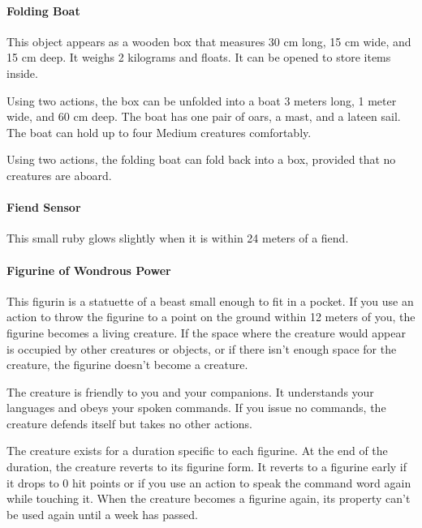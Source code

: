     \paragraph{Folding Boat}
        This object appears as a wooden box that measures 30 cm long, 15 cm wide, and 15 cm deep.
        It weighs 2 kilograms and floats.
        It can be opened to store items inside.

        Using two actions, the box can be unfolded into a boat 3 meters long, 1 meter wide, and 60 cm deep.
        The boat has one pair of oars, a mast, and a lateen sail.
        The boat can hold up to four Medium creatures comfortably.

        Using two actions, the folding boat can fold back into a box, provided that no creatures are aboard.
    \paragraph{Fiend Sensor}
        This small ruby glows slightly when it is within 24 meters of a fiend.
    \paragraph{Figurine of Wondrous Power}
        This figurin is a statuette of a beast small enough to fit in a pocket.
        If you use an action to throw the figurine to a point on the ground within 12 meters of you, the figurine becomes a living creature.
        If the space where the creature would appear is occupied by other creatures or objects, or if there isn't enough space for the creature, the figurine doesn't become a creature.

        The creature is friendly to you and your companions.
        It understands your languages and obeys your spoken commands.
        If you issue no commands, the creature defends itself but takes no other actions.

        The creature exists for a duration specific to each figurine.
        At the end of the duration, the creature reverts to its figurine form.
        It reverts to a figurine early if it drops to 0 hit points or if you use an action to speak the command word again while touching it.
        When the creature becomes a figurine again, its property can't be used again until a week has passed.

